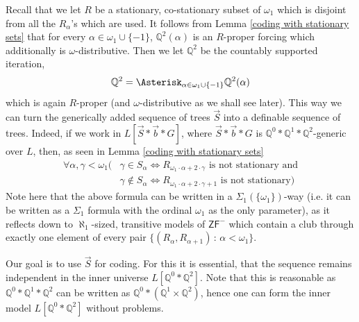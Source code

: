 \documentclass[a4paper,11pt]{article}
\newcommand{\forceQ}{\mathbb{Q}}
\newcommand{\ZFP}{\mathsf{ZF}^-}
\begin{document}
Recall that we let $R$ be a stationary, co-stationary subset of $\omega_1$ which is disjoint from all the $R_{\alpha}$'s which are used. It follows from Lemma \ref{coding with stationary sets} that for every $\alpha \in \omega_1 \cup \{-1\}$, $\forceQ^2 (\alpha)$ is an $R$-proper forcing which additionally is $\omega$-distributive.  Then we let $\mathbb{Q}^2$ be the countably supported iteration, $$\mathbb{Q}^2=\Asterisk_{\alpha \in  \omega_1 \cup \{-1\} } \forceQ^2 (\alpha)$$ which is again $R$-proper (and $\omega$-distributive as we shall see later).
This way we can turn the generically added sequence of trees $\vec{S}$ into a definable sequence of trees.
Indeed, if we work in $L[\vec{S}\ast \vec{b} \ast G]$, where $\vec{S} \ast\vec{b} \ast  G$ is $\forceQ^0 \ast \mathbb{Q}^1 \ast \forceQ^2$-generic over $L$, then, as seen in Lemma \ref{coding with stationary sets} 
\begin{align*}
\forall \alpha, \gamma < \omega_1 (&\gamma \in S_{\alpha} \Leftrightarrow R_{\omega_1 \cdot \alpha + 2 \cdot \gamma} \text{ is not stationary and} \\ &
\gamma \notin S_{\alpha} \Leftrightarrow  R_{\omega_1 \cdot \alpha + 2 \cdot \gamma +1} \text{ is not stationary})
\end{align*}
Note here that the above formula can be written in a $\Sigma_1(\{\omega_1\} )$-way (i.e. it can be written as a $\Sigma_1$ formula with the ordinal $\omega_1$ as the only parameter), as  it reflects down to $\aleph_1$-sized, transitive models of $\ZFP$ which contain a club through exactly one element of every pair $\{(R_{\alpha}, R_{\alpha+1}) \, : \, \alpha < \omega_1\}$.


Our goal is to use $\vec{S}$ for coding. For this it is essential, that the sequence remains independent in the inner  universe $L[\forceQ^0 \ast \forceQ^2]$. Note that this is reasonable as $\forceQ^0 \ast \forceQ^1 \ast \forceQ^2$ can be written as $\forceQ^0 \ast ( \forceQ^1 \times \forceQ^2)$, hence one can form the inner model $L[\forceQ^0 \ast \forceQ^2]$ without problems.
\end{document}
